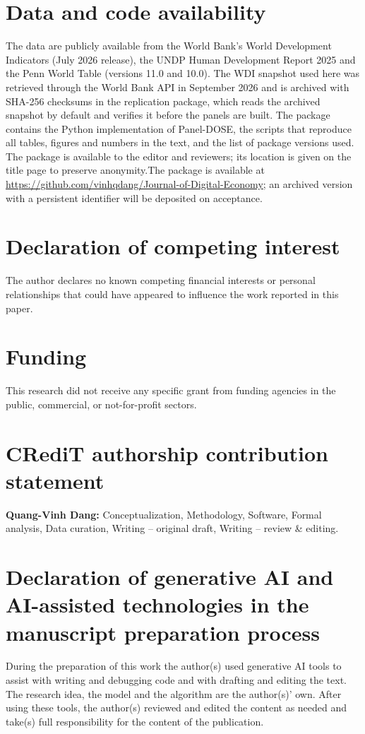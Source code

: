 \documentclass[preprint,12pt,authoryear]{elsarticle}
\begin{document}
\section*{Data and code availability}
The data are publicly available from the World Bank's World Development Indicators (July 2026 release), the UNDP Human Development Report 2025 and the Penn World Table (versions 11.0 and 10.0). The WDI snapshot used here was retrieved through the World Bank API in September 2026 and is archived with SHA-256 checksums in the replication package, which reads the archived snapshot by default and verifies it before the panels are built. The package contains the Python implementation of Panel-DOSE, the scripts that reproduce all tables, figures and numbers in the text, and the list of package versions used.
\ifblind The package is available to the editor and reviewers; its location is given on the title page to preserve anonymity.\else The package is available at \url{https://github.com/vinhqdang/Journal-of-Digital-Economy}; an archived version with a persistent identifier will be deposited on acceptance.\fi

\ifblind\else
\section*{Declaration of competing interest}
The author declares no known competing financial interests or personal relationships that could have appeared to influence the work reported in this paper.

\section*{Funding}
This research did not receive any specific grant from funding agencies in the public, commercial, or not-for-profit sectors.

\section*{CRediT authorship contribution statement}
\textbf{Quang-Vinh Dang:} Conceptualization, Methodology, Software, Formal analysis, Data curation, Writing -- original draft, Writing -- review \& editing.
\fi

\section*{Declaration of generative AI and AI-assisted technologies in the manuscript preparation process}
During the preparation of this work the author(s) used generative AI tools to assist with writing and debugging code and with drafting and editing the text. The research idea, the model and the algorithm are the author(s)' own. After using these tools, the author(s) reviewed and edited the content as needed and take(s) full responsibility for the content of the publication.

{\singlespacing


}
\end{document}
